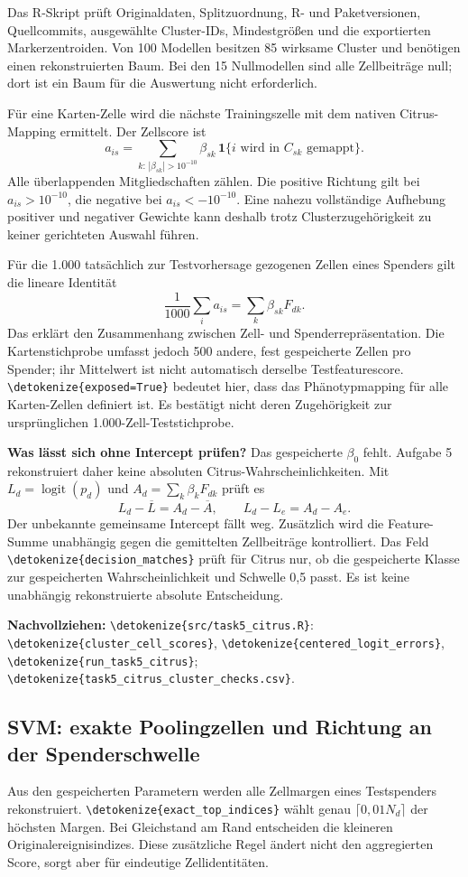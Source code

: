 \documentclass[11pt,a4paper]{article}
\newcommand{\code}[1]{\expandafter\nolinkurl\expandafter{\detokenize{#1}}}
\newcommand{\source}[1]{\par{\footnotesize\raggedright\color{muted}\textbf{Nachvollziehen:} #1\par}}
\begin{document}
Das R-Skript prüft Originaldaten, Splitzuordnung, R- und Paketversionen,
Quellcommits, ausgewählte Cluster-IDs, Mindestgrößen und die exportierten
Markerzentroiden. Von 100 Modellen besitzen 85 wirksame Cluster und
benötigen einen rekonstruierten Baum. Bei den 15 Nullmodellen sind alle
Zellbeiträge null; dort ist ein Baum für die Auswertung nicht erforderlich.

Für eine Karten-Zelle wird die nächste Trainingszelle mit dem nativen
Citrus-Mapping ermittelt. Der Zellscore ist
\[
 a_{is}=\sum_{k:\,|\beta_{sk}|>10^{-10}}
         \beta_{sk}\,\mathbf1\{i\text{ wird in }C_{sk}\text{ gemappt}\}.
\]
Alle überlappenden Mitgliedschaften zählen. Die positive Richtung gilt
bei \(a_{is}>10^{-10}\), die negative bei \(a_{is}<-10^{-10}\).
Eine nahezu vollständige Aufhebung positiver und negativer Gewichte
kann deshalb trotz Clusterzugehörigkeit zu keiner gerichteten Auswahl führen.

Für die 1.000 tatsächlich zur Testvorhersage gezogenen Zellen eines
Spenders gilt die lineare Identität
\[
 \frac1{1000}\sum_i a_{is}=\sum_k\beta_{sk}F_{dk}.
\]
Das erklärt den Zusammenhang zwischen Zell- und Spenderrepräsentation.
Die Kartenstichprobe umfasst jedoch 500 andere, fest gespeicherte Zellen
pro Spender; ihr Mittelwert ist nicht automatisch derselbe Testfeaturescore.
\code{exposed=True} bedeutet hier, dass das Phänotypmapping für alle
Karten-Zellen definiert ist. Es bestätigt nicht deren Zugehörigkeit zur
ursprünglichen 1.000-Zell-Teststichprobe.

\textbf{Was lässt sich ohne Intercept prüfen?} Das gespeicherte
\(\beta_0\) fehlt. Aufgabe 5 rekonstruiert daher keine absoluten
Citrus-Wahrscheinlichkeiten. Mit \(L_d=\operatorname{logit}(p_d)\)
und \(A_d=\sum_k\beta_kF_{dk}\) prüft es
\[
 L_d-\overline L=A_d-\overline A,
 \qquad L_d-L_e=A_d-A_e.
\]
Der unbekannte gemeinsame Intercept fällt weg. Zusätzlich wird die
Feature-Summe unabhängig gegen die gemittelten Zellbeiträge kontrolliert.
Das Feld \code{decision_matches} prüft für Citrus nur, ob die gespeicherte
Klasse zur gespeicherten Wahrscheinlichkeit und Schwelle 0,5 passt.
Es ist keine unabhängig rekonstruierte absolute Entscheidung.
\source{\code{src/task5_citrus.R}: \code{cluster_cell_scores},
\code{centered_logit_errors}, \code{run_task5_citrus};
\code{task5_citrus_cluster_checks.csv}.}

\clearpage
\subsection*{SVM: exakte Poolingzellen und Richtung an der Spenderschwelle}
Aus den gespeicherten Parametern werden alle Zellmargen eines Testspenders
rekonstruiert. \code{exact_top_indices} wählt genau
\(\lceil0{,}01N_d\rceil\) der höchsten Margen. Bei Gleichstand am
Rand entscheiden die kleineren Originalereignisindizes. Diese zusätzliche
Regel ändert nicht den aggregierten Score, sorgt aber für eindeutige
Zellidentitäten.
\end{document}
